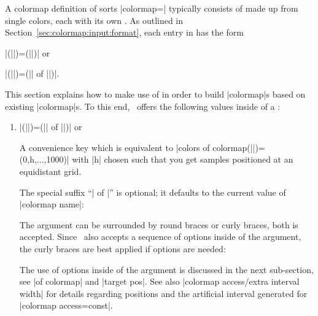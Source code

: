 A colormap definition of sorts |colormap=| typically consists of  made up from single colors, each with its own . As outlined in Section~\ref{sec:colormap:input:format}, each entry in  has the form 

	|(||)=(||)| or

	|(||)=(|| of ||)|.

\noindent This section explains how to make use of  in order to build |colormap|s based on existing |colormap|s. To this end, \PGFPlots\ offers the following values inside of a :

\begin{enumerate}

	\item

	|(||)=(|| of ||)| or

	A convenience key which is equivalent to |colors of colormap(||)=(0,h,...,1000)| with |h| chosen such that you get  samples positioned at an equidistant grid.

\begin{codeexample}[]
\pgfplotscolorbardrawstandalone[
	colormap={example}{%
		samples of colormap=(4 of viridis)
	},
	colorbar horizontal,
	colormap access=const]
\end{codeexample}

	The special suffix ``| of |'' is optional; it defaults to the current value of |colormap name|:
\begin{codeexample}[]
\pgfplotscolorbardrawstandalone[
	colormap={example}{%
		samples of colormap=(4)
	},
	colorbar horizontal,
	colormap access=const]
\end{codeexample}

	The argument can be surrounded by round braces or curly braces, both is accepted. Since \PGFPlots\ also accepts a sequence of options inside of the argument, the curly braces are best applied if options are needed:
\begin{codeexample}[]
\pgfplotscolorbardrawstandalone[
	colormap={example}{%
		samples of colormap={
			5 of viridis,
			target pos={-10,-3,0,1,2}
		}
	},
	colorbar horizontal,
	colormap access=const]
\end{codeexample}
	The use of options inside of the argument is discussed in the next sub-section, see |of colormap| and |target pos|. See also |colormap access/extra interval width| for details regarding positions and the artificial interval generated for |colormap access=const|.


\end{enumerate}
